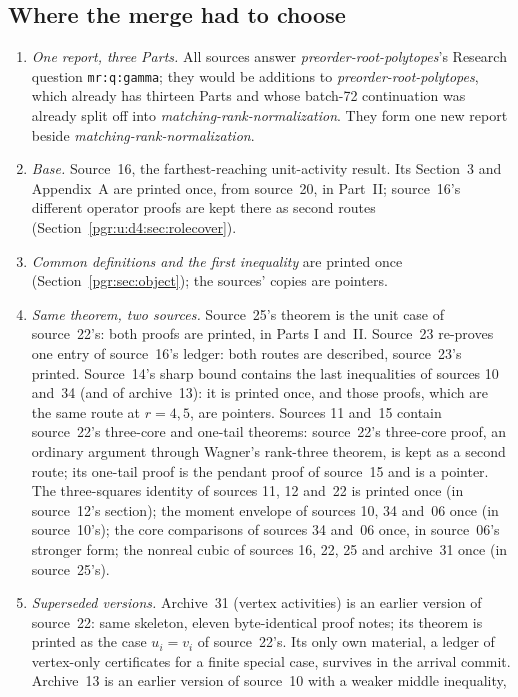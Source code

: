 \documentclass[11pt]{article}
\numberwithin{equation}{section}
\theoremstyle{definition}\newtheorem{definition}[theorem]{Definition}\newtheorem{remark}[theorem]{Remark}
\newcommand{\prp}{\emph{preorder-root-polytopes}}
\newcommand{\mrn}{\emph{matching-rank-normalization}}
\begin{document}
\subsection{Where the merge had to choose}\label{pgr:sec:prov:choices}
\begin{enumerate}[leftmargin=*]
\item \emph{One report, three Parts.} All sources answer \prp's Research
  question \texttt{mr:q:gamma}; they would be additions to \prp, which
  already has thirteen Parts and whose batch-72 continuation was already
  split off into \mrn. They form one new report beside \mrn.
\item \emph{Base.} Source~16, the farthest-reaching unit-activity result.
  Its Section~3 and Appendix~A are printed once, from source~20, in
  Part~II; source~16's different operator proofs are kept there as second
  routes (Section~\ref{pgr:u:d4:sec:rolecover}).
\item \emph{Common definitions and the first inequality} are printed once
  (Section~\ref{pgr:sec:object}); the sources' copies are pointers.
\item \emph{Same theorem, two sources.} Source~25's theorem is the unit case
  of source~22's: both proofs are printed, in Parts I and~II. Source~23
  re-proves one entry of source~16's ledger: both routes are described,
  source~23's printed. Source~14's sharp bound contains the last
  inequalities of sources 10 and~34 (and of archive~13): it is printed
  once, and those proofs, which are the same route at $r=4,5$, are
  pointers. Sources 11 and~15 contain source~22's three-core and one-tail
  theorems: source~22's three-core proof, an ordinary argument through
  Wagner's rank-three theorem, is kept as a second route; its one-tail
  proof is the pendant proof of source~15 and is a pointer. The
  three-squares identity of sources 11, 12 and~22 is printed once (in
  source~12's section); the moment envelope of sources 10, 34 and~06 once
  (in source~10's); the core comparisons of sources 34 and~06 once, in
  source~06's stronger form; the nonreal cubic of sources 16, 22, 25 and
  archive~31 once (in source~25's).
\item \emph{Superseded versions.} Archive~31 (vertex activities) is an
  earlier version of source~22: same skeleton, eleven byte-identical
  proof notes; its theorem is printed as the case $u_i=v_i$ of source~22's.
  Its only own material, a ledger of vertex-only certificates for a finite
  special case, survives in the arrival commit. Archive~13 is an earlier
  version of source~10 with a weaker middle inequality,

\end{enumerate}
\end{document}
